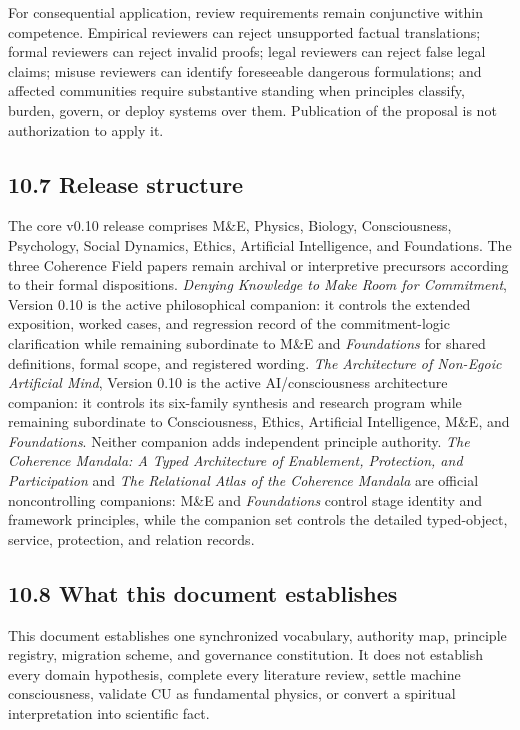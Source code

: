 \documentclass[
  11pt,
]{article}
\begin{document}
For consequential application, review requirements remain conjunctive
within competence. Empirical reviewers can reject unsupported factual
translations; formal reviewers can reject invalid proofs; legal
reviewers can reject false legal claims; misuse reviewers can identify
foreseeable dangerous formulations; and affected communities require
substantive standing when principles classify, burden, govern, or deploy
systems over them. Publication of the proposal is not authorization to
apply it.

\subsection{10.7 Release structure}\label{release-structure}

The core v0.10 release comprises M\&E, Physics, Biology, Consciousness,
Psychology, Social Dynamics, Ethics, Artificial Intelligence, and
Foundations. The three Coherence Field papers remain archival or
interpretive precursors according to their formal dispositions.
\emph{Denying Knowledge to Make Room for Commitment}, Version 0.10 is
the active philosophical companion: it controls the extended exposition,
worked cases, and regression record of the commitment-logic
clarification while remaining subordinate to M\&E and \emph{Foundations}
for shared definitions, formal scope, and registered wording. \emph{The
Architecture of Non-Egoic Artificial Mind}, Version 0.10 is the active
AI/consciousness architecture companion: it controls its six-family
synthesis and research program while remaining subordinate to
Consciousness, Ethics, Artificial Intelligence, M\&E, and
\emph{Foundations}. Neither companion adds independent principle
authority. \emph{The Coherence Mandala: A Typed Architecture of
Enablement, Protection, and Participation} and \emph{The Relational
Atlas of the Coherence Mandala} are official noncontrolling companions:
M\&E and \emph{Foundations} control stage identity and framework
principles, while the companion set controls the detailed typed-object,
service, protection, and relation records.

\subsection{10.8 What this document
establishes}\label{what-this-document-establishes}

This document establishes one synchronized vocabulary, authority map,
principle registry, migration scheme, and governance constitution. It
does not establish every domain hypothesis, complete every literature
review, settle machine consciousness, validate CU as fundamental
physics, or convert a spiritual interpretation into scientific fact.
\end{document}
